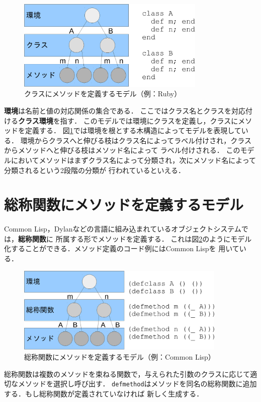\documentclass[a4paper,11pt,dvipdfmx]{jreport}
\begin{document}
\begin{figure}[htbp]
	\centering
	\includegraphics[width=9cm]{fig/trees_class-crop.pdf}
	\caption{クラスにメソッドを定義するモデル（例：Ruby）}
	\label{figure:class-model}
\end{figure}

\textbf{環境}は名前と値の対応関係の集合である．
ここではクラス名とクラスを対応付ける\textbf{クラス環境}を指す．
このモデルでは環境にクラスを定義し，クラスにメソッドを定義する．
図\ref{figure:class-model}では環境を根とする木構造によってモデルを表現している．
環境からクラスへと伸びる枝はクラス名によってラベル付けされ，クラスからメソッドへと伸びる枝はメソッド名によって
ラベル付けされる．
このモデルにおいてメソッドはまずクラス名によって分類され，次にメソッド名によって分類されるという2段階の分類が
行われているといえる．

\section{総称関数にメソッドを定義するモデル}

Common Lisp，Dylanなどの言語に組み込まれているオブジェクトシステムでは，\textbf{総称関数}に
所属する形でメソッドを定義する．
これは図\ref{figure:gf-model}のようにモデル化することができる．メソッド定義のコード例にはCommon Lispを
用いている．

\begin{figure}[htbp]
	\centering
	\includegraphics[width=10cm]{fig/trees_gf-crop.pdf}
	\caption{総称関数にメソッドを定義するモデル（例：Common Lisp）}
	\label{figure:gf-model}
\end{figure}

総称関数は複数のメソッドを束ねる関数で，与えられた引数のクラスに応じて適切なメソッドを選択し呼び出す．
\verb|defmethod|はメソッドを同名の総称関数に追加する．もし総称関数が定義されていなければ
新しく生成する．
\end{document}
